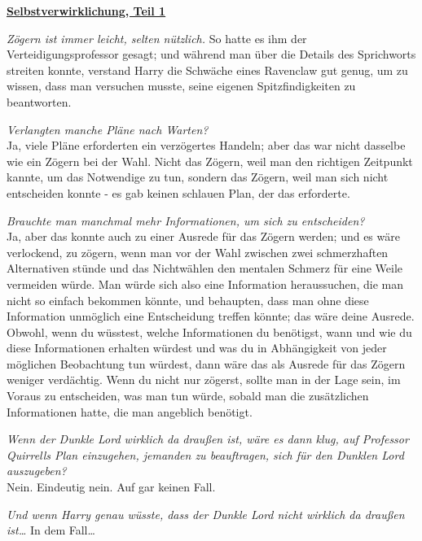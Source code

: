 

\hypertarget{selbstverwirklichung-teil-1}{%

\textbf{\uline{Selbstverwirklichung, Teil 1}}

\emph{Zögern ist immer leicht, selten nützlich.} So hatte es ihm der Verteidigungsprofessor gesagt; und während man über die Details des Sprichworts streiten konnte, verstand Harry die Schwäche eines Ravenclaw gut genug, um zu wissen, dass man versuchen musste, seine eigenen Spitzfindigkeiten zu beantworten.

\emph{Verlangten manche Pläne nach Warten?}\\ Ja, viele Pläne erforderten ein verzögertes Handeln; aber das war nicht dasselbe wie ein Zögern bei der Wahl. Nicht das Zögern, weil man den richtigen Zeitpunkt kannte, um das Notwendige zu tun, sondern das Zögern, weil man sich nicht entscheiden konnte - es gab keinen schlauen Plan, der das erforderte.

\emph{Brauchte man manchmal mehr Informationen, um sich zu entscheiden?}\\ Ja, aber das konnte auch zu einer Ausrede für das Zögern werden; und es wäre verlockend, zu zögern, wenn man vor der Wahl zwischen zwei schmerzhaften Alternativen stünde und das Nichtwählen den mentalen Schmerz für eine Weile vermeiden würde. Man würde sich also eine Information heraussuchen, die man nicht so einfach bekommen könnte, und behaupten, dass man ohne diese Information unmöglich eine Entscheidung treffen könnte; das wäre deine Ausrede. Obwohl, wenn du wüsstest, welche Informationen du benötigst, wann und wie du diese Informationen erhalten würdest und was du in Abhängigkeit von jeder möglichen Beobachtung tun würdest, dann wäre das als Ausrede für das Zögern weniger verdächtig. Wenn du nicht nur zögerst, sollte man in der Lage sein, im Voraus zu entscheiden, was man tun würde, sobald man die zusätzlichen Informationen hatte, die man angeblich benötigt.

\emph{Wenn der Dunkle Lord wirklich da draußen ist, wäre es dann klug, auf Professor Quirrells Plan einzugehen, jemanden zu beauftragen, sich für den Dunklen Lord auszugeben?}\\ Nein. Eindeutig nein. Auf gar keinen Fall.

\emph{Und wenn Harry genau wüsste, dass der Dunkle Lord nicht wirklich da draußen ist…} In dem Fall…

}
